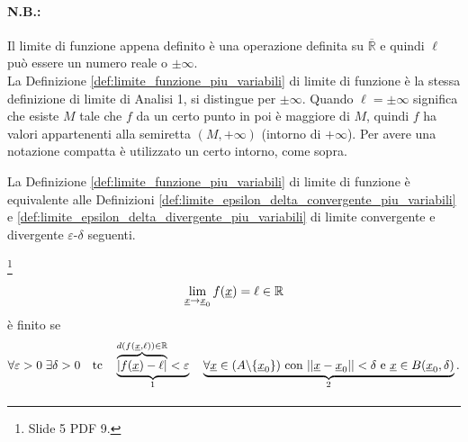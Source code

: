 \addtocounter{footnote}{-1}


\paragraph{N.B.:} Il limite di funzione appena definito è una operazione definita su $\overline{\mathbb R}$ e quindi $\ell$ può essere un numero reale o $\pm\infty$.\\
La Definizione \ref{def:limite_funzione_piu_variabili} di limite di funzione è la stessa definizione di limite di Analisi 1, si distingue per $\pm\infty$. Quando $\ell=\pm\infty$ significa che esiste $M$ tale che $f$ da un certo punto in poi è maggiore di $M$, quindi $f$ ha valori appartenenti alla semiretta $(M,+\infty)$ (intorno di $+\infty$). Per avere una notazione compatta è utilizzato un certo intorno, come sopra.

La Definizione \ref{def:limite_funzione_piu_variabili} di limite di funzione è equivalente alle Definizioni \ref{def:limite_epsilon_delta_convergente_piu_variabili} e \ref{def:limite_epsilon_delta_divergente_piu_variabili} di limite convergente e divergente $\varepsilon$-$\delta$ seguenti.

\begin{definition}\label{def:limite_epsilon_delta_convergente_piu_variabili}\footnote{Slide 5 PDF 9.}
    \begin{equation*}
        \lim\limits_{\uline x\rightarrow\uline x_0}f(\uline x)=\ell\in\mathbb R
    \end{equation*}
    è finito se
    \begin{equation}
        \forall\varepsilon>0\;\exists\delta>0\quad\text{tc}\quad \underbrace{\overbrace{|f(\uline x)-\ell|}^{d(f(\uline x,\ell))\in\mathbb R}<\varepsilon}_{\footnotemark}\quad \underbrace{\forall\uline x\in(A\backslash\{\uline x_0\}) \text{ con } ||\uline x-\uline x_0||<\delta \text{ e } \uline x\in B(\uline x_0,\delta)}_{\footnotemark}.
    \end{equation}
\end{definition}

